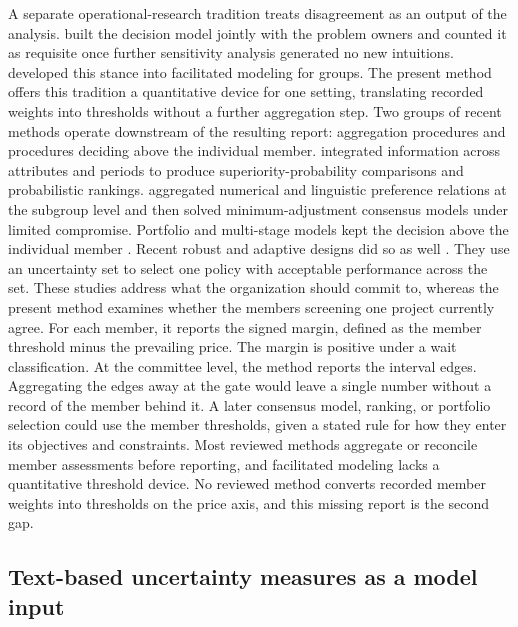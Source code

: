 \documentclass[5p,times,authoryear]{elsarticle}
\theoremstyle{plain}
\begin{document}
A separate operational-research tradition treats disagreement as an output of the analysis. \citet{Phillips1984} built the decision model jointly with the problem owners and counted it as requisite once further sensitivity analysis generated no new intuitions. \citet{FrancoMontibeller2010} developed this stance into facilitated modeling for groups. The present method offers this tradition a quantitative device for one setting, translating recorded weights into thresholds without a further aggregation step. Two groups of recent methods operate downstream of the resulting report: aggregation procedures and procedures deciding above the individual member. \citet{Dong2026} integrated information across attributes and periods to produce superiority-probability comparisons and probabilistic rankings. \citet{SongLi2026} aggregated numerical and linguistic preference relations at the subgroup level and then solved minimum-adjustment consensus models under limited compromise. Portfolio and multi-stage models kept the decision above the individual member \citep{Marques2022,ShenLi2023,Saiz2024}. Recent robust and adaptive designs did so as well \citep{Shen2025,ShavazipourStewart2026}. They use an uncertainty set to select one policy with acceptable performance across the set. These studies address what the organization should commit to, whereas the present method examines whether the members screening one project currently agree. For each member, it reports the signed margin, defined as the member threshold minus the prevailing price. The margin is positive under a wait classification. At the committee level, the method reports the interval edges. Aggregating the edges away at the gate would leave a single number without a record of the member behind it. A later consensus model, ranking, or portfolio selection could use the member thresholds, given a stated rule for how they enter its objectives and constraints. Most reviewed methods aggregate or reconcile member assessments before reporting, and facilitated modeling lacks a quantitative threshold device. No reviewed method converts recorded member weights into thresholds on the price axis, and this missing report is the second gap.

\subsection{Text-based uncertainty measures as a model input}
\end{document}
